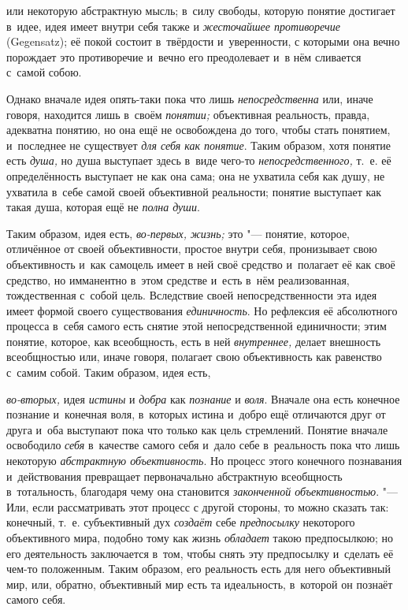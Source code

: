 или некоторую абстрактную мысль; в~силу свободы, которую
понятие достигает в~идее, идея имеет внутри себя также и
{\em жесточайшее противоречие}
(Gegensatz); её покой состоит в~твёрдости и~уверенности, с
которыми она вечно порождает это противоречие и~вечно его преодолевает и~в
нём сливается с~самой собою.

Однако вначале идея опять-таки пока что лишь
{\em непосредственна}
или, иначе говоря, находится лишь в~своём
{\em понятии;}
объективная реальность, правда, адекватна понятию, но она ещё
не освобождена до того, чтобы стать понятием, и~последнее не существует
{\em для себя как понятие}.
Таким образом, хотя понятие есть
{\em душа,} но душа
выступает здесь в~виде чего-то
{\em непосредственного,}
т.~е. её определённость выступает не как она сама; она не
ухватила себя как душу, не ухватила в~себе самой своей объективной
реальности; понятие выступает как такая душа, которая ещё не
{\em полна души}.

Таким образом, идея есть,
{\em во-первых,}
{\em жизнь;} это
"--- понятие, которое, отличённое от своей объективности,
простое внутри себя, пронизывает свою объективность и~как самоцель имеет в
ней своё средство и~полагает её как своё средство, но имманентно в~этом
средстве и~есть в~нём реализованная, тождественная с~собой цель. Вследствие
своей непосредственности эта идея имеет формой своего существования
{\em единичность}. Но
рефлексия её абсолютного процесса в~себя самого есть снятие этой
непосредственной единичности; этим понятие, которое, как всеобщность, есть
в ней {\em внутреннее,}
делает внешность всеобщностью или, иначе говоря, полагает
свою объективность как равенство с~самим собой. Таким образом, идея есть,

{\em во-вторых,} идея
{\em истины} и
{\em добра} как
{\em познание} и
{\em воля}. Вначале она
есть конечное познание и~конечная воля, в~которых истина и~добро ещё
отличаются друг от друга и~оба выступают пока что только как цель
стремлений. Понятие вначале освободило
{\em себя} в~качестве
самого себя и~дало себе в~реальность пока что лишь некоторую
{\em абстрактную объективность}.
Но процесс этого конечного познавания и~действования
превращает первоначально абстрактную всеобщность в~тотальность, благодаря
чему она становится {\em законченной
объективностью}. "--- Или, если рассматривать этот процесс с
другой стороны, то можно сказать так: конечный, т.~е. субъективный дух
{\em создаёт} себе
{\em предпосылку}
некоторого объективного мира, подобно тому как жизнь
{\em обладает} такою
предпосылкою; но его деятельность заключается в~том, чтобы
снять эту предпосылку и~сделать её чем-то положенным. Таким образом, его
реальность есть для него объективный мир, или, обратно, объективный мир
есть та идеальность, в~которой он познаёт самого себя.

